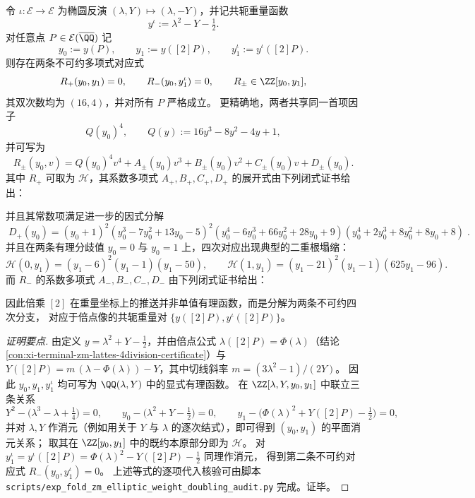\begin{conclusion}\label{con:xi-terminal-zm-weight-doubling-quartic-closure}
令 \(\iota:\mathcal{E}\to\mathcal{E}\) 为椭圆反演 \((\lambda,Y)\mapsto(\lambda,-Y)\)，并记共轭重量函数
\[
y^{\iota}:=\lambda^{2}-Y-\tfrac12.
\]
对任意点 \(P\in\mathcal{E}(\overline{\QQ})\) 记
\[
y_0:=y(P),\qquad y_1:=y([2]P),\qquad y_1^{\iota}:=y^{\iota}([2]P).
\]
则存在两条不可约多项式对应式
\[
R_{+}(y_0,y_1)=0,\qquad R_{-}(y_0,y_1^{\iota})=0,
\qquad R_{\pm}\in\ZZ[y_0,y_1],
\]
其双次数均为 \((16,4)\)，并对所有 \(P\) 严格成立。
更精确地，两者共享同一首项因子
\[
Q(y_0)^{4},
\qquad
Q(y):=16y^{3}-8y^{2}-4y+1,
\]
并可写为
\[
R_{\pm}(y_0,v)=Q(y_0)^{4}v^{4}+A_{\pm}(y_0)v^{3}+B_{\pm}(y_0)v^{2}+C_{\pm}(y_0)v+D_{\pm}(y_0).
\]
其中 \(R_{+}\) 可取为 \(\mathcal H\)，其系数多项式 \(A_{+},B_{+},C_{+},D_{+}\) 的展开式由下列闭式证书给出：

并且其常数项满足进一步的因式分解
\[
\boxed{\;
D_{+}(y_0)
=(y_0+1)^{2}(y_0^{3}-7y_0^{2}+13y_0-5)^{2}(y_0^{4}-6y_0^{3}+66y_0^{2}+28y_0+9)(y_0^{4}+2y_0^{3}+8y_0^{2}+8y_0+8)\; }.
\]
并且在两条有理分歧值 \(y_0=0\) 与 \(y_0=1\) 上，四次对应出现典型的二重根塌缩：
\[
\mathcal H(0,y_1)=(y_1-6)^{2}(y_1-1)(y_1-50),
\qquad
\mathcal H(1,y_1)=(y_1-21)^{2}(y_1-1)(625y_1-96).
\]
而 \(R_{-}\) 的系数多项式 \(A_{-},B_{-},C_{-},D_{-}\) 由下列闭式证书给出：

\par
因此倍乘 \([2]\) 在重量坐标上的推送并非单值有理函数，而是分解为两条不可约四次分支，
对应于倍点像的共轭重量对 \(\{y([2]P),y^{\iota}([2]P)\}\)。
\end{conclusion}
\begin{proof}[证明要点]
由定义 \(y=\lambda^{2}+Y-\tfrac12\)，并由倍点公式
\(
\lambda([2]P)=\Phi(\lambda)
\)（结论 \ref{con:xi-terminal-zm-lattes-4division-certificate}）与
\(
Y([2]P)=m\,(\lambda-\Phi(\lambda))-Y
\)，其中切线斜率 \(m=(3\lambda^{2}-1)/(2Y)\)。
因此 \(y_0,y_1,y_1^{\iota}\) 均可写为 \(\QQ(\lambda,Y)\) 中的显式有理函数。
在 \(\ZZ[\lambda,Y,y_0,y_1]\) 中联立三条关系
\[
Y^{2}-\bigl(\lambda^{3}-\lambda+\tfrac14\bigr)=0,\qquad
y_0-\bigl(\lambda^{2}+Y-\tfrac12\bigr)=0,\qquad
y_1-\bigl(\Phi(\lambda)^{2}+Y([2]P)-\tfrac12\bigr)=0,
\]
并对 \(\lambda,Y\) 作消元（例如用关于 \(Y\) 与 \(\lambda\) 的逐次结式），即可得到 \((y_0,y_1)\) 的平面消元关系；
取其在 \(\ZZ[y_0,y_1]\) 中的既约本原部分即为 \(\mathcal H\)。
对 \(y_1^{\iota}=y^{\iota}([2]P)=\Phi(\lambda)^{2}-Y([2]P)-\tfrac12\) 同理作消元，
得到第二条不可约对应式 \(R_{-}(y_0,y_1^{\iota})=0\)。
上述等式的逐项代入核验可由脚本 \texttt{scripts/exp\_fold\_zm\_elliptic\_weight\_doubling\_audit.py} 完成。证毕。
\end{proof}

